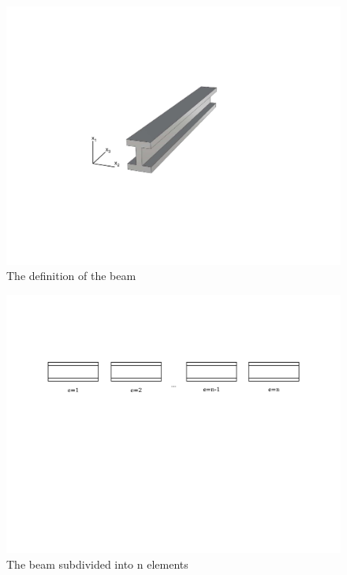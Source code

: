 \begin{figure}[htb]
\centering
\includegraphics[width=0.95\columnwidth,trim=4cm 7cm 6cm 6.5cm, clip]{figs/straight.pdf}
\caption{The definition of the beam}
 \label{fig:beam_definition}
\end{figure}


\begin{figure}
\centering
\includegraphics[width=0.7\columnwidth,trim=0cm 12cm 0cm 0cm, clip]{figs/wshape_elements.png}
\caption{The beam subdivided into n elements}
\label{fig:subdivision}
\end{figure}

